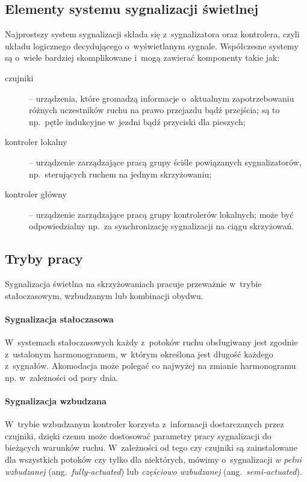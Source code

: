 \documentclass{pracamgr}
\newcommand{\ang}[1]{(ang.~\emph{#1})}
\theoremstyle{plain}
\begin{document}
\subsection{Elementy systemu sygnalizacji świetlnej}
\label{ss:elementy} Najprostszy system sygnalizacji składa się
z~sygnalizatora oraz kontrolera, czyli układu logicznego decydującego
o~wyświetlanym sygnale. Współczesne systemy są o~wiele bardziej
skomplikowane i~mogą zawierać komponenty takie jak:
\begin{description}
  \item[czujniki] -- urządzenia, które gromadzą informacje o~aktualnym
  zapotrzebowaniu różnych uczestników ruchu na prawo przejazdu bądź
  przejścia; są to np.~pętle indukcyjne w~jezdni bądź przyciski dla
  pieszych;
  \item[kontroler lokalny] -- urządzenie zarządzające pracą grupy
  ściśle powiązanych sygnalizatorów, np.~sterujących ruchem na jednym
  skrzyżowaniu;
  \item[kontroler główny] -- urządzenie zarządzające pracą grupy
  kontrolerów lokalnych; może być odpowiedzialny np.~za synchronizację
  sygnalizacji na ciągu skrzyżowań.
\end{description}

\subsection{Tryby pracy}
\label{ss:tryby} Sygnalizacja świetlna na skrzyżowaniach pracuje
przeważnie w~trybie stałoczasowym, wzbudzanym lub kombinacji obydwu.

\paragraph{Sygnalizacja stałoczasowa} W~systemach stałoczasowych każdy
z~potoków ruchu obsługiwany jest zgodnie z~ustalonym harmonogramem,
w~którym określona jest długość każdego z~sygnałów. Akomodacja może
polegać co najwyżej na zmianie harmonogramu np. w~zależności od pory dnia.

\paragraph{Sygnalizacja wzbudzana}
W~trybie wzbudzanym kontroler korzysta z~informacji dostarczanych
przez czujniki, dzięki czemu może dostosować parametry pracy
sygnalizacji do bieżących warunków ruchu. W~zależności od tego czy
czujniki są zainstalowane dla wszystkich potoków czy tylko dla
niektórych, mówimy o~sygnalizacji \emph{w pełni wzbudzanej}
\ang{fully-actuated} lub \emph{częściowo wzbudzanej}
\ang{semi-actuated}.
\end{document}
